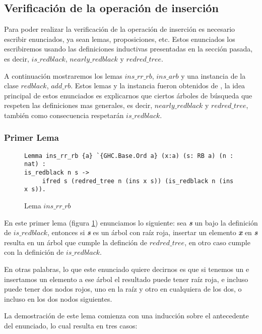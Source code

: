 \subsection{Verificación de la operación de inserción}

Para poder realizar la verificaci\'on de la operaci\'on de inserci\'on es necesario escribir
enunciados, ya sean lemas, proposiciones, etc. Estos enunciados los escribiremos usando las 
definiciones inductivas presentadas en la secci\'on pasada, es decir, $is\_redblack$, 
$nearly\_redblack$ y $redred\_tree$.

A continuaci\'on mostraremos los lemas $ins\_rr\_rb$, $ins\_arb$ y una instancia \cite{classes}
de la clase $redblack$, $add\_rb$. Estos lemas y la instancia fueron obtenidos de \cite{MSetRBT},
la idea principal de estos enunciados es explicarnos que ciertos \'arboles de b\'usqueda que 
respeten las definiciones mas generales, es decir, $nearly\_redblack$ y $redred\_tree$, también 
como consecuencia respetar\'an $is\_redblack$.

\subsubsection{Primer Lema}

\begin{figure}[!ht]
\centering
\captionsetup{justification=centering}
\begin{verbatim}
Lemma ins_rr_rb {a} `{GHC.Base.Ord a} (x:a) (s: RB a) (n : nat) :
is_redblack n s ->
     ifred s (redred_tree n (ins x s)) (is_redblack n (ins x s)).
\end{verbatim}
\caption{Lema $ins\_rr\_rb$}
\label{lema_1}
\end{figure}

En este primer lema (figura \ref{lema_1}) enunciamos lo siguiente: sea \textit{\textbf{s}} un {\arn} 
bajo la definici\'on de $is\_redblack$, entonces si \textit{\textbf{s}} es un \'arbol con raíz roja, 
insertar un elemento \textit{\textbf{x}} en \textit{\textbf{s}} resulta en un \'arbol que cumple la 
definci\'on de $redred\_tree$, en otro caso cumple con la definici\'on de $is\_redblack$.

En otras palabras, lo que este enunciado quiere decirnos es que si tenemos un {\arn} e insertamos
un elemento a ese \'arbol el resultado puede tener ra\'iz roja, e incluso puede tener dos nodos
rojos, uno en la ra\'iz y otro en cualquiera de los dos, o incluso en los dos nodos siguientes.

La demostraci\'on de este lema comienza con una inducci\'on sobre el antecedente del enunciado, lo 
cual resulta en tres casos:

